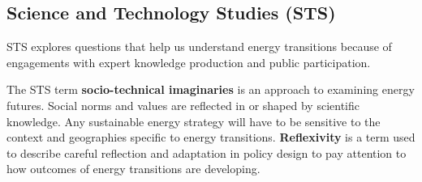 \subsection{Science and Technology Studies (STS)}

STS explores questions that help us understand energy transitions because of
engagements with expert knowledge production and public participation.

The STS term \textbf{socio-technical imaginaries} is an approach to examining
energy futures. Social norms and values are reflected in or shaped by
scientific knowledge. Any sustainable energy strategy will have to be sensitive
to the context and geographies specific to energy transitions.
\textbf{Reflexivity} is a term used to describe careful reflection and
adaptation in policy design to pay attention to how outcomes of energy
transitions are developing.
